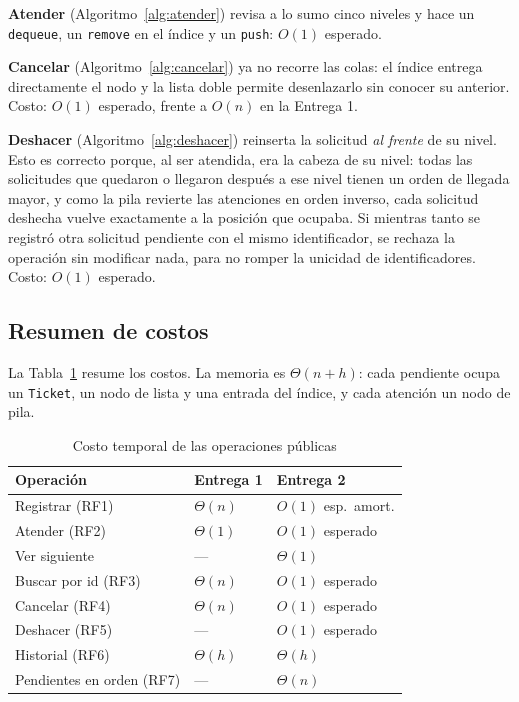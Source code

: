 \textbf{Atender} (Algoritmo~\ref{alg:atender}) revisa a lo sumo cinco
niveles y hace un \texttt{dequeue}, un \texttt{remove} en el índice y un
\texttt{push}: $O(1)$ esperado.

\textbf{Cancelar} (Algoritmo~\ref{alg:cancelar}) ya no recorre las colas:
el índice entrega directamente el nodo y la lista doble permite
desenlazarlo sin conocer su anterior. Costo: $O(1)$ esperado, frente a
$O(n)$ en la Entrega 1.

\textbf{Deshacer} (Algoritmo~\ref{alg:deshacer}) reinserta la solicitud
\emph{al frente} de su nivel. Esto es correcto porque, al ser atendida,
era la cabeza de su nivel: todas las solicitudes que quedaron o llegaron
después a ese nivel tienen un orden de llegada mayor, y como la pila
revierte las atenciones en orden inverso, cada solicitud deshecha vuelve
exactamente a la posición que ocupaba. Si mientras tanto se registró otra
solicitud pendiente con el mismo identificador, se rechaza la operación sin
modificar nada, para no romper la unicidad de identificadores. Costo:
$O(1)$ esperado.

\subsection{Resumen de costos}

La Tabla~\ref{tab:complejidad} resume los costos. La memoria es
$\Theta(n+h)$: cada pendiente ocupa un \texttt{Ticket}, un nodo de lista y
una entrada del índice, y cada atención un nodo de pila.

\begin{table}[t]
  \caption{Costo temporal de las operaciones públicas}
  \label{tab:complejidad}
  \centering
  \footnotesize
  \begin{tabular}{p{}p{}p{}}
    \toprule
    Operación & Entrega 1 & Entrega 2 \\
    \midrule
    Registrar (RF1) & $\Theta(n)$ & $O(1)$ esp.\ amort. \\
    Atender (RF2) & $\Theta(1)$ & $O(1)$ esperado \\
    Ver siguiente & --- & $\Theta(1)$ \\
    Buscar por id (RF3) & $\Theta(n)$ & $O(1)$ esperado \\
    Cancelar (RF4) & $\Theta(n)$ & $O(1)$ esperado \\
    Deshacer (RF5) & --- & $O(1)$ esperado \\
    Historial (RF6) & $\Theta(h)$ & $\Theta(h)$ \\
    Pendientes en orden (RF7) & --- & $\Theta(n)$ \\
    \bottomrule
  \end{tabular}
\end{table}
